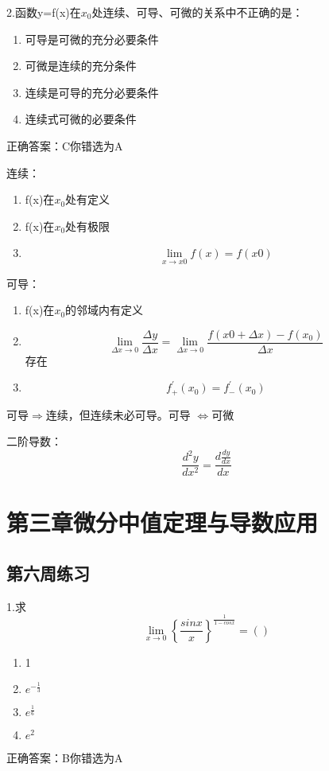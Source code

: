 \documentclass[fleqn]{article}
\begin{document}
\begin{flushleft}
2.函数y=f(x)在$x_0$处连续、可导、可微的关系中不正确的是：
\begin{enumerate}
\item 可导是可微的充分必要条件
\item 可微是连续的充分条件
\item 连续是可导的充分必要条件
\item 连续式可微的必要条件
\end{enumerate}
正确答案：C你错选为A
\par
连续：
\begin{enumerate}
\item f(x)在$x_0$处有定义
\item f(x)在$x_0$处有极限
\item \[\lim_{x\to x0}f(x)=f(x0)\]
\end{enumerate}
可导：
\begin{enumerate}
\item f(x)在$x_0$的邻域内有定义
\item \[\lim_{\Delta x\to 0}\frac{\Delta y}{\Delta x}=\lim_{\Delta x\to 0}\frac{f(x0+\Delta x)-f(x_0)}{\Delta x}\]存在
\item \[f_{+}^{'}(x_0)=f_{-}^{'}(x_0)\]
\end{enumerate}
可导$\Longrightarrow$连续，但连续未必可导。可导
$\Longleftrightarrow$可微

二阶导数：\[\frac{d^2y}{dx^2}=\frac{d\frac{dy}{dx}}{dx}\]

\section{第三章微分中值定理与导数应用}
\subsection{第六周练习}
1.求\[\lim_{x\to 0}\left\lbrace\frac{sinx}{x}\right\rbrace^\frac{1}{1-cosx}=()\]
\begin{enumerate}
\item 1
\item $e^{-\frac{1}{3}}$
\item $e^{\frac{1}{6}}$
\item $e^2$
\end{enumerate}
正确答案：B你错选为A

\end{flushleft}
\end{document}
